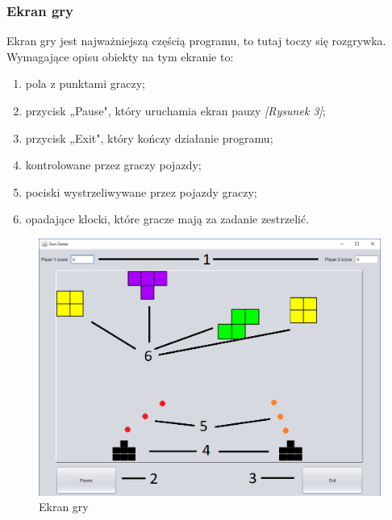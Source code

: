 \documentclass[12pt]{report}
\begin{document}
    \subsubsection{Ekran gry}
    Ekran gry jest najważniejszą częścią programu, to tutaj toczy się rozgrywka. Wymagające opisu obiekty na tym ekranie to:
    \begin{enumerate}
        \item pola z punktami graczy;
        \item przycisk „Pause", który uruchamia ekran pauzy \textit{[Rysunek 3]};
        \item przycisk „Exit", który kończy działanie programu;
        \item kontrolowane przez graczy pojazdy;
        \item pociski wystrzeliwywane przez pojazdy graczy;
        \item opadające klocki, które gracze mają za zadanie zestrzelić.
    \end{enumerate}
    \begin{figure}[H]
    \centering
    \includegraphics[width=14cm]{Obrazy/gamescreen.png}
    \caption{Ekran gry}
    \label{Game screen}
    \end{figure}
\end{document}
